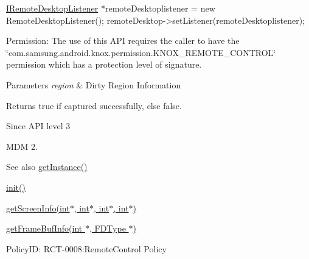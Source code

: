 \begin{DoxyPre}	 \hyperlink{classknoxremotedesktop_1_1IRemoteDesktopListener}{IRemoteDesktopListener} *remoteDesktoplistener = new RemoteDesktopListener();
	 remoteDesktop->setListener(remoteDesktoplistener);
 \end{DoxyPre}


\begin{DoxyParagraph}{\-Permission\-: }
\-The use of this \-A\-P\-I requires the caller to have the \char`\"{}com.\-samsung.\-android.\-knox.\-permission.\-K\-N\-O\-X\-\_\-\-R\-E\-M\-O\-T\-E\-\_\-\-C\-O\-N\-T\-R\-O\-L\char`\"{} permission which has a protection level of signature.
\end{DoxyParagraph}

\begin{DoxyParams}{\-Parameters}
{\em region} & \-Dirty \-Region \-Information \\
\hline
\end{DoxyParams}
\begin{DoxyReturn}{\-Returns}
{\ttfamily true} if captured successfully, else {\ttfamily false}. 
\end{DoxyReturn}
\begin{DoxySince}{\-Since}
\-A\-P\-I level 3 

\-M\-D\-M 2. 
\end{DoxySince}
\begin{DoxySeeAlso}{\-See also}
\hyperlink{classknoxremotedesktop_1_1IRemoteDesktop_a86eefbec946d605470af069999763f74}{get\-Instance()} 

\hyperlink{classknoxremotedesktop_1_1IRemoteDesktop_a7bed40d98c61713a69cf1dad8b37beae}{init()} 

\hyperlink{classknoxremotedesktop_1_1IRemoteDesktop_ae9a1e6863bfc2affad4462bc0a29914a}{get\-Screen\-Info(int$\ast$, int$\ast$, int$\ast$, int$\ast$)} 

\hyperlink{classknoxremotedesktop_1_1IRemoteDesktop_a57d5432823adfd7cfb72441469ccc98e}{get\-Frame\-Buf\-Info(int $\ast$, F\-D\-Type $\ast$)} 
\end{DoxySeeAlso}
\begin{DoxyParagraph}{\-Policy\-I\-D\-: }
\-R\-C\-T-\/0008\-:\-Remote\-Control \-Policy 
\end{DoxyParagraph}
